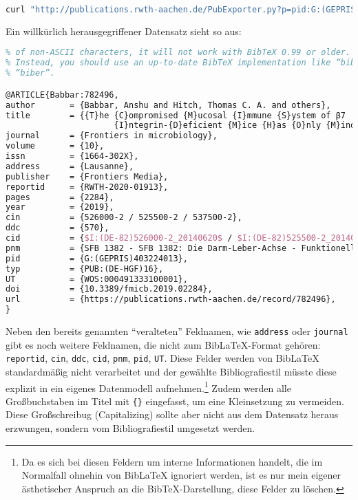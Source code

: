 \documentclass[ngerman]{dtk}
\begin{document}
\begin{lstlisting}[style=nonumber,language=Bash]
curl "http://publications.rwth-aachen.de/PubExporter.py?p=pid:G:(GEPRIS)403224013&of=hx" > sfb.bib
\end{lstlisting}
Ein willkürlich herausgegriffener Datensatz sieht so aus:
\begin{lstlisting}[style=number,language=TeX]
% IMPORTANT: The following is UTF-8 encoded.  This means that in the presence
% of non-ASCII characters, it will not work with BibTeX 0.99 or older.
% Instead, you should use an up-to-date BibTeX implementation like “bibtex8” or
% “biber”.

@ARTICLE{Babbar:782496,
author       = {Babbar, Anshu and Hitch, Thomas C. A. and others},
title        = {{T}he {C}ompromised {M}ucosal {I}mmune {S}ystem of β7
                      {I}ntegrin-{D}eficient {M}ice {H}as {O}nly {M}inor {E}ffects on the {F}ecal {M}icrobiota in {H}omeostasis},
journal      = {Frontiers in microbiology},
volume       = {10},
issn         = {1664-302X},
address      = {Lausanne},
publisher    = {Frontiers Media},
reportid     = {RWTH-2020-01913},
pages        = {2284},
year         = {2019},
cin          = {526000-2 / 525500-2 / 537500-2},
ddc          = {570},
cid          = {$I:(DE-82)526000-2_20140620$ / $I:(DE-82)525500-2_20140620$ / $I:(DE-82)537500-2_20140620$},
pnm          = {SFB 1382 - SFB 1382: Die Darm-Leber-Achse - Funktionelle Zusammenhänge und therapeutische Strategien (403224013)},
pid          = {G:(GEPRIS)403224013},
typ          = {PUB:(DE-HGF)16},
UT           = {WOS:000491333100001},
doi          = {10.3389/fmicb.2019.02284},
url          = {https://publications.rwth-aachen.de/record/782496},
}
\end{lstlisting} 
Neben den bereits genannten ``veralteten'' Feldnamen, wie 
\texttt{address} oder \texttt{journal} gibt es noch weitere Feldnamen,
die nicht zum BibLaTeX-Format gehören:
\texttt{reportid}, \texttt{cin}, \texttt{ddc}, \texttt{cid}, \texttt{pnm}, \texttt{pid}, \texttt{UT}.
Diese Felder werden von BibLaTeX standardmäßig nicht verarbeitet
und der gewählte Bibliografiestil müsste diese explizit in ein
eigenes Datenmodell aufnehmen.\footnote{Da es sich bei diesen Feldern um interne Informationen handelt,
die im Normalfall ohnehin von BibLaTeX ignoriert werden, ist es nur mein eigener ästhetischer Anspruch 
an die BibTeX-Darstellung, diese Felder zu löschen.}
Zudem werden alle Großbuchstaben im Titel mit \texttt{\{\}} eingefasst,
um eine Kleinsetzung zu vermeiden. Diese Großschreibug (Capitalizing)
 sollte aber nicht aus dem Datensatz heraus erzwungen, sondern vom 
Bibliografiestil umgesetzt werden.
\end{document}
